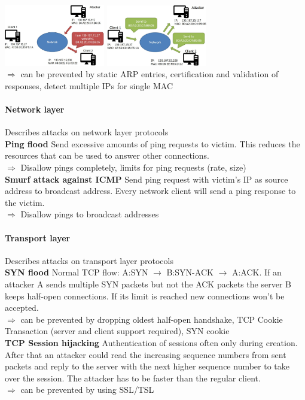 \documentclass[12pt]{article}
\begin{document}
	\includegraphics[width=0.33\textwidth]{figures/arp-mitm2.JPG}
	\includegraphics[width=0.33\textwidth]{figures/arp-mitm3.JPG}\\
	$\Rightarrow$ can be prevented by static ARP entries, certification and validation of responses, detect multiple IPs for single MAC
	
	\paragraph{Network layer} Describes attacks on network layer protocols\\
	\textbf{Ping flood} Send excessive amounts of ping requests to victim. This reduces the resources that can be used to answer other connections.\\
	$\Rightarrow$ Disallow pings completely, limits for ping requests (rate, size)\\
	\textbf{Smurf attack against ICMP} Send ping request with victim's IP as source address to broadcast address. Every network client will send a ping response to the victim.\\
	$\Rightarrow$ Disallow pings to broadcast addresses
	
	\paragraph{Transport layer} Describes attacks on transport layer protocols\\
	\textbf{SYN flood} Normal TCP flow: A:SYN $\rightarrow$ B:SYN-ACK $\rightarrow$ A:ACK. If an attacker A sends multiple SYN packets but not the ACK packets the server B keeps half-open connections. If its limit is reached new connections won't be accepted.\\
	$\Rightarrow$ can be prevented by dropping oldest half-open handshake, TCP Cookie Transaction (server and client support required), SYN cookie\\
	\textbf{TCP Session hijacking} Authentication of sessions often only during creation. After that an attacker could read the increasing sequence numbers from sent packets and reply to the server with the next higher sequence number to take over the session. The attacker has to be faster than the regular client.\\
	$\Rightarrow$ can be prevented by using SSL/TSL
	
\end{document}
